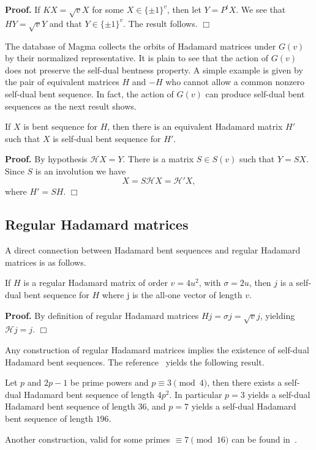 \documentclass[12pt]{article}
\newenvironment{pf}{\noindent\textbf{Proof.}\quad}{\hfill{$\Box$}}
\begin{document}
\begin{pf}
 If $KX=\sqrt{v}X$ for some $X\in \{\pm 1\}^v$, then let $Y=P^tX$. We see that $HY=\sqrt{v}Y$ and that $Y\in \{\pm 1\}^v$. The result follows.
\end{pf}


The database of Magma collects the orbits of Hadamard matrices under $G(v)$ by their normalized representative. It is plain to see that the action of $G(v)$ does not preserve
the self-dual bentness property. A simple example is given by the pair of equivalent matrices $H$ and $-H$ who cannot allow a common nonzero self-dual bent sequence. In fact, the action of $G(v)$
can produce self-dual bent sequences as the next result shows.

{\prop If $X$ is bent sequence for $H$, then there is an equivalent Hadamard matrix $H'$ such that $X$ is self-dual bent sequence for $H'$.}

\begin{pf}
 By hypothesis $\mathcal{H}X=Y$. There is a  matrix $S \in S(v)$  such that $Y=SX$. Since $S$ is an involution we have
 $$ X=S\mathcal{H}X=\mathcal{H'}X, $$ where $H'=SH$.
\end{pf}

\subsection{Regular Hadamard matrices}
A direct connection between Hadamard bent sequences and regular Hadamard matrices is as follows.

{\prop If $H$ is a regular Hadamard matrix of order $v=4u^2$, with $\sigma=2u$, then $j$ is a self-dual bent sequence for $H$ where j is the all-one vector of length $v$.}

\begin{pf}
 By definition of regular Hadamard matrices $Hj=\sigma j=\sqrt{v}j$, yielding $\mathcal{H}j=j$.
\end{pf}

Any construction of regular Hadamard matrices implies the existence of self-dual Hadamard bent sequences. The reference~\cite{Crn:2006} yields the following result.

{\coro Let $p$ and $2p-1$ be prime powers and $p\equiv 3 \pmod{4}$, then there exists a self-dual Hadamard bent sequence of length $4p^2$.
In particular $p=3$ yields a self-dual Hadamard bent sequence of length $36$, and $p=7$ yields a self-dual Hadamard bent sequence of length $196$.}

Another construction, valid for some primes $\equiv 7 \pmod{16}$ can be found in~\cite{LMS:2006}.
\end{document}
